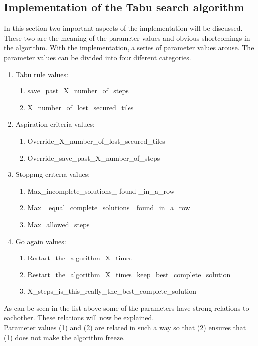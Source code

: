 \subsection{Implementation of the Tabu search algorithm}
In this section two important aspects of the implementation will be discussed. These two are the meaning of the parameter values and obvious shortcomings in the algorithm. With the implementation, a series of parameter values arouse. The parameter values can be divided into four diferent categories.
\begin{enumerate}
\item{} Tabu rule values:
\begin{enumerate}
\item{} save\_past\_X\_number\_of\_steps
\item{} X\_number\_of\_lost\_secured\_tiles
\end{enumerate} 
\item{} Aspiration criteria values:
\begin{enumerate}
\item{} Override\_X\_number\_of\_lost\_secured\_tiles
\item{} Override\_save\_past\_X\_number\_of\_steps
\end{enumerate} 
\item{} Stopping criteria values:
\begin{enumerate}
\item{} Max\_incomplete\_solutions\_ found \_in\_a\_row
\item{} Max\_ equal\_complete\_solutions\_ found\_in\_a\_row
\item{} Max\_allowed\_steps
\end{enumerate} 
\item{} Go again values:
\begin{enumerate}
\item{} Restart\_the\_algorithm\_X\_times
\item{} Restart\_the\_algorithm\_X\_times\_keep\_best\_complete\_solution
\item{} X\_steps\_is\_this\_really\_the\_best\_complete\_solution
\end{enumerate} 
\end{enumerate} 
As can be seen in the list above some of the parameters have strong relations to eachother. These relations will now be explained. \\
Parameter values (1) and (2) are related in such a way so that (2) ensures that (1) does not make the algorithm freeze. \\
